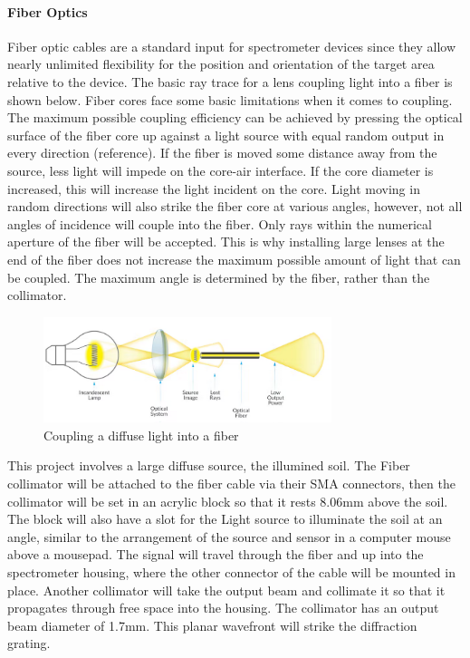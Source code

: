 \paragraph{Fiber Optics} Fiber optic cables are a standard input for spectrometer devices since they allow nearly unlimited flexibility for the position and orientation of the target area relative to the device. The basic ray trace for a lens coupling light into a fiber is shown below. Fiber cores face some basic limitations when it comes to coupling. The maximum possible coupling efficiency can be achieved by pressing the optical surface of the fiber core up against a light source with equal random output in every direction (reference). If the fiber is moved some distance away from the source, less light will impede on the core-air interface. If the core diameter is increased, this will increase the light incident on the core. Light moving in random directions will also strike the fiber core at various angles, however, not all angles of incidence will couple into the fiber. Only rays within the numerical aperture of the fiber will be accepted. This is why installing large lenses at the end of the fiber does not increase the maximum possible amount of light that can be coupled. The maximum angle is determined by the fiber, rather than the collimator.

\begin{figure}[H]
    \caption{Coupling a diffuse light into a fiber}
    \centering
    \includegraphics[width=0.75\textwidth]{images/CouplingDiffuseLighttoFiber.png}
\end{figure}

This project involves a large diffuse source, the illumined soil. The Fiber collimator will be attached to the fiber cable via their SMA connectors, then the collimator will be set in an acrylic block so that it rests 8.06mm above the soil. The block will also have a slot for the Light source to illuminate the soil at an angle, similar to the arrangement of the source and sensor in a computer mouse above a mousepad.
The signal will travel through the fiber and up into the spectrometer housing, where the other connector of the cable will be mounted in place. Another collimator will take the output beam and collimate it so that it propagates through free space into the housing. The collimator has an output beam diameter of 1.7mm. This planar wavefront will strike the diffraction grating.

